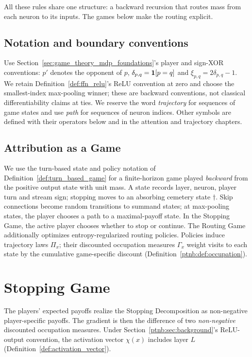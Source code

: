 All these rules share one structure: a backward recursion that routes mass from each neuron to its
inputs. The games below make the routing explicit.

\subsection{Notation and boundary conventions}\label{ptnb:app:notation}\label{ptnb:app:notation-identities}
Use Section~\ref{sec:game_theory_mdp_foundations}'s player and sign-XOR conventions: $p'$ denotes the opponent of $p$,
$\delta_{p,q}=\mathbf{1}[p=q]$ and $\xi_{p,q}=2\delta_{p,q}-1$.
We retain Definition~\ref{def:ffn_relu}'s ReLU convention at zero and choose the smallest-index max-pooling
winner; these are backward conventions, not classical differentiability claims at ties.
We reserve the word \emph{trajectory} for sequences of game states and use \emph{path} for sequences of neuron indices.
Other symbols are defined with their operators below and in the attention and trajectory chapters.

\subsection{Attribution as a Game}\label{ptnb:sec:game}

We use the turn-based state and policy notation of Definition~\ref{def:turn_based_game} for a finite-horizon game played \emph{backward} from the positive output state with unit mass. A state records layer, neuron, player turn and stream sign;
stopping moves to an absorbing cemetery state $\dagger$. Skip connections become random transitions to
summand states; at max-pooling states, the player chooses a path to a maximal-payoff state. In the Stopping Game, the active player chooses whether to stop or continue. The Routing Game additionally optimizes entropy-regularized routing policies. Policies induce trajectory
laws $\Pi_x$; their discounted occupation measures $\Gamma_x$ weight visits to each state by the
cumulative game-specific discount (Definition~\ref{ptnb:def:occupation}).


\section{Stopping Game}\label{ptnb:app:relu-net-game}\label{ptnb:app:adf-game}\label{ptnb:sec:stopping}\label{sec:stopping_game_reinterpretation}

The players' expected payoffs realize the Stopping Decomposition as non-negative player-specific payoffs. The gradient is then the
difference of two \emph{non-negative} discounted occupation measures. Under Section~\ref{ptnb:sec:background}'s
ReLU-output convention, the activation vector $\chi(x)$ includes layer $L$ (Definition~\ref{def:activation_vector}).

